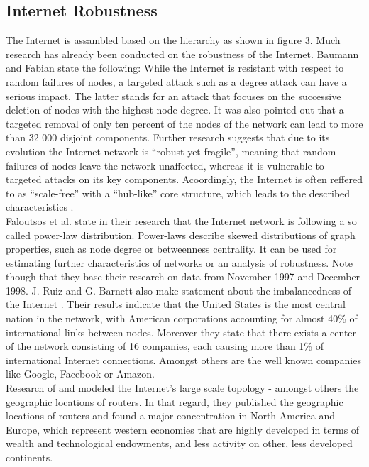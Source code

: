\documentclass[conference, 11pt]{IEEEtran}
\begin{document}
\subsection{Internet Robustness}
The Internet is assambled based on the hierarchy as shown in figure 3. Much research has already been conducted on the robustness of the Internet. Baumann and Fabian \cite{howRobust} state the following: While the Internet is resistant with respect to random failures of nodes, a targeted attack such as a degree attack can have a serious impact. The latter stands for an attack that focuses on the successive deletion of nodes with the highest node degree. It was also pointed out that a targeted removal of only ten percent of the nodes of the network can lead to more than 32 000 disjoint components. Further research suggests that due to its evolution the Internet network  is ``robust yet fragile''\cite{RYF}, meaning that random failures of nodes leave the network unaffected, whereas it is vulnerable to targeted attacks on its key components. Acoordingly, the Internet is often reffered to as ``scale-free'' with a ``hub-like'' core structure, which leads to the described characteristics \cite{RYF}. \\ \linebreak Faloutsos et al. \cite{powerlawCitation} state in their research that the Internet network is following a so called power-law distribution. Power-laws describe skewed distributions of graph properties, such as node degree or betweenness centrality. It can be used for estimating further characteristics of networks or an analysis of robustness. Note though that they base their research on data from November 1997 and December 1998. J. Ruiz and G. Barnett also make statement about the imbalancedness of the Internet \cite{owningInternet}. Their results indicate that the United States is the most central nation in the network, with American corporations accounting for almost 40\% of international links between nodes. Moreover they state that there exists a center of the network consisting of 16 companies, each causing more than 1\% of international Internet connections. Amongst others are the well known companies like Google, Facebook or Amazon. \\ \linebreak
Research of \cite{geoResearch} and \cite{geoVul} modeled the Internet's large scale topology - amongst others the geographic locations of routers. In that regard, they published the geographic locations of routers and found a major concentration in North America and Europe, which represent western economies that are highly developed in terms of wealth and technological endowments, and less activity on other, less developed continents.\\  \linebreak
 
\end{document}
